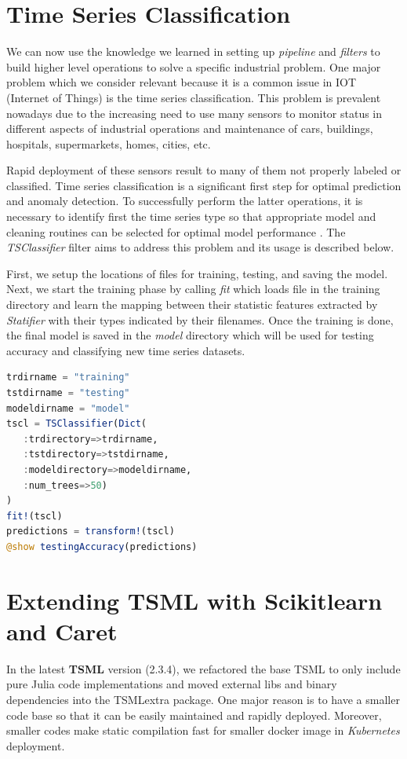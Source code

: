 \documentclass{juliacon}
\begin{document}
\section{Time Series Classification}

We can now use the knowledge we learned in setting up 
\emph{pipeline} and \emph{filters} to build higher level
operations to solve a specific industrial problem. One major problem
which we consider relevant because it is a common issue in IOT (Internet of Things) 
 is the time series classification. This problem is prevalent nowadays 
due to the increasing need to use many sensors to monitor status in different aspects of industrial
operations and maintenance of cars, buildings, hospitals, supermarkets, homes, cities, etc.

Rapid deployment of these sensors result to many of them not properly labeled or classified.
Time series classification is a significant first step for optimal prediction and anomaly detection.
To successfully perform the latter operations, it is necessary to identify first the time series
type so that appropriate model and cleaning routines can be selected for optimal model performance . 
The  \emph{TSClassifier} filter aims to address this problem and its usage is described below.

\vskip 6pt
First, we setup the locations of files for training, testing, and saving the model.
Next, we start the training phase by calling \emph{fit} which loads
file in the training directory and learn the mapping between their
statistic features extracted by \emph{Statifier} with their types indicated
by their filenames. Once the training is done, the final model
is saved in the \emph{model} directory which will be used for 
testing accuracy and classifying new time series datasets. 

\begin{lstlisting}[language = Julia]
trdirname = "training"
tstdirname = "testing"
modeldirname = "model"
tscl = TSClassifier(Dict(
   :trdirectory=>trdirname,
   :tstdirectory=>tstdirname,
   :modeldirectory=>modeldirname,
   :num_trees=>50)
)
fit!(tscl)
predictions = transform!(tscl)
@show testingAccuracy(predictions)
\end{lstlisting}

\section{Extending TSML with Scikitlearn and Caret}
In the latest \textbf{TSML} version (2.3.4), we refactored the base TSML
to only include pure Julia code implementations and moved
external libs and binary dependencies into the TSMLextra package. 
One major reason is to have a smaller code base so that it can be easily
maintained and rapidly deployed. Moreover, smaller codes make
static compilation fast for smaller docker image  
in \emph{Kubernetes} deployment. 
\end{document}
